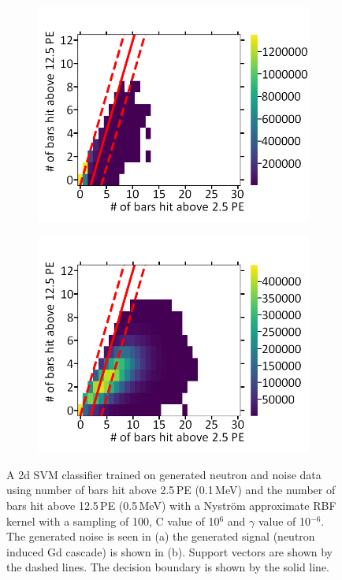 \begin{figure}[!h]
\centering
\begin{subfigure}{.5\textwidth}
  \centering
  \includegraphics[width=\linewidth]{Chapter4/Figs/Raster/noiseNeutronSVM_C1e6_g1e-6MedText.png}
  \captionsetup{width=.9\linewidth}
  \caption{}
  \label{subFig:noiseNeutronSVM_C1e6_g1e-6}
\end{subfigure}%
\begin{subfigure}{.5\textwidth}
  \centering
  \includegraphics[width=\linewidth]{Chapter4/Figs/Raster/signalNeutronSVM_C1e6_g1e-6MedText.png}
  \captionsetup{width=.9\linewidth}
  \caption{}
  \label{subFig:signalNeutronSVM_C1e6_g1e-6}
\end{subfigure}
\caption{A 2d SVM classifier trained on generated neutron and noise data using number of bars hit above 2.5\,PE (0.1\,MeV) and the number of bars hit above 12.5\,PE (0.5\,MeV) with a Nyström approximate RBF kernel with a sampling of 100, C value of 10$^6$ and $\gamma$ value of 10$^{-6}$. The generated noise is seen in (a) the generated signal (neutron induced Gd cascade) is shown in (b). Support vectors are shown by the dashed lines. The decision boundary is shown by the solid line.}
\label{fig:signalAndNoiseNeutronSVM_C1e6_g1e-6}
\end{figure}

